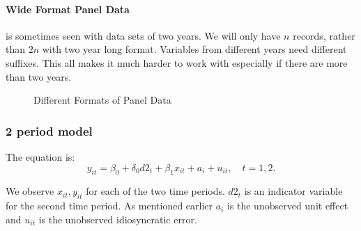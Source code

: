 \documentclass[11pt]{article}
\begin{document}
\paragraph{Wide Format Panel Data} is sometimes seen with data sets of two years. We will only have $n$ records, rather than $2n$ with two year long format. Variables from different years need different suffixes. This all makes it much harder to work with especially if there are more than two years.
\begin{figure}[h]
    \centering
    \qquad
    \caption{Different Formats of Panel Data}%
    \label{fig:panel format}%
\end{figure}


\subsubsection{2 period model}

The equation is:
\begin{equation}
    \label{panel simple model}
    y_{it} = \beta_0 + \delta_0 d2_t + \beta_1 x_{it} + a_i + u_{it}, \quad t=1,2.
\end{equation}

We observe $x_{it}, y_{it}$ for each of the two time periods. $d2_t$ is an indicator variable for the second time period. As mentioned earlier $a_i$ is the unobserved unit effect and $u_{it}$ is the unobserved idiosyncratic error.
\end{document}

